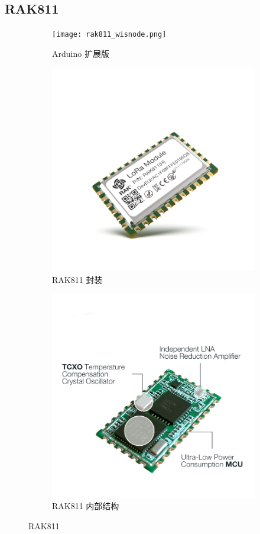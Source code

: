 \documentclass[scheme=chinese,a4paper]{article}
\begin{document}
\subsection{RAK811}
\begin{figure}[H]
  \begin{subfigure}[t]{0.33\textwidth}
    \texttt{[image: rak811\_wisnode.png]}
    \caption{Arduino 扩展版}
  \end{subfigure}
  \begin{subfigure}[t]{0.33\textwidth}
    \includegraphics[width=\textwidth]{RAK811.png}
    \caption{RAK811 封装}
  \end{subfigure}
  \begin{subfigure}[t]{0.33\textwidth}
    \includegraphics[width=\textwidth]{RAK811J_2.png}
    \caption{RAK811 内部结构}
  \end{subfigure}
\caption{RAK811}
\end{figure}
\end{document}

